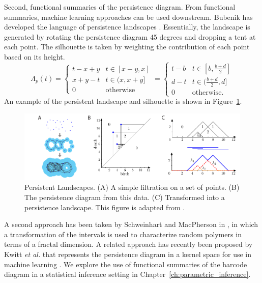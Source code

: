 Second, functional summaries of the persistence diagram.
From functional summaries, machine learning approaches can be used downstream.
Bubenik has developed the language of persistence landscapes \cite{Bubenik:2007ux,Bubenik2015:um}.
Essentially, the landscape is generated by rotating the persistence diagram 45 degrees and dropping a tent at each point.
The silhouette is taken by weighting the contribution of each point based on its height.
\begin{equation}
 \Lambda_{p}(t) =
 \begin{cases}
  t-x+y & t \in [x-y, x] \\
  x+y-t & t \in (x,  x+y] \\
  0 & \text{otherwise}
 \end{cases}
 =
 \begin{cases}
  t-b & t \in [b, \frac{b+d}{2}] \\
  d-t & t \in (\frac{b+d}{2}, d] \\
  0 & \text{otherwise}.
 \end{cases}
\end{equation}
An example of the persistent landscape and silhouette is shown in Figure~\ref{fig:bg:persistence_landscape}.

\begin{figure}
\centering
\includegraphics[]{fig/background/persistence_landscape.pdf}
\caption[Persistent Landscape]{Persistent Landscapes. (A) A simple filtration on a set of points. (B) The persistence diagram from this data. (C) Transformed into a persistence landscape. This figure is adapted from \cite[Fig.~2]{Bubenik2015:um}.}
\label{fig:bg:persistence_landscape}
\end{figure}

A second approach has been taken by Schweinhart and MacPherson in \cite{MacPherson:2012eq}, in which a transformation of the intervals is used to characterize random polymers in terms of a fractal dimension.
A related approach has recently been proposed by Kwitt \emph{et al.} that represents the persistence diagram in a kernel space for use in machine learning \cite{Kwitt:2015,Reininghaus:2015a}.
We explore the use of functional summaries of the barcode diagram in a statistical inference setting in Chapter~\ref{ch:parametric_inference}.

